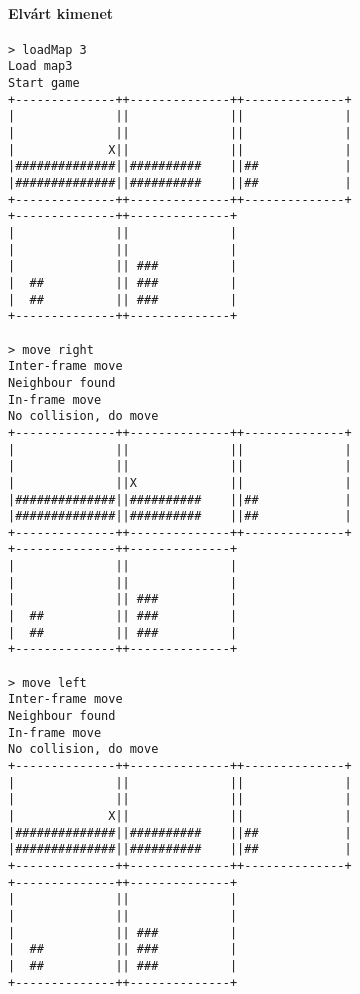 		        \paragraph*{Elvárt kimenet}
\begin{verbatim}
> loadMap 3
Load map3
Start game
+--------------++--------------++--------------+
|              ||              ||              |
|              ||              ||              |
|             X||              ||              |
|##############||##########    ||##            |
|##############||##########    ||##            |
+--------------++--------------++--------------+
+--------------++--------------+                
|              ||              |                
|              ||              |                
|              || ###          |                
|  ##          || ###          |                
|  ##          || ###          |                
+--------------++--------------+                

> move right
Inter-frame move
Neighbour found
In-frame move
No collision, do move
+--------------++--------------++--------------+
|              ||              ||              |
|              ||              ||              |
|              ||X             ||              |
|##############||##########    ||##            |
|##############||##########    ||##            |
+--------------++--------------++--------------+
+--------------++--------------+                
|              ||              |                
|              ||              |                
|              || ###          |                
|  ##          || ###          |                
|  ##          || ###          |                
+--------------++--------------+                

> move left
Inter-frame move
Neighbour found
In-frame move
No collision, do move
+--------------++--------------++--------------+
|              ||              ||              |
|              ||              ||              |
|             X||              ||              |
|##############||##########    ||##            |
|##############||##########    ||##            |
+--------------++--------------++--------------+
+--------------++--------------+                
|              ||              |                
|              ||              |                
|              || ###          |                
|  ##          || ###          |                
|  ##          || ###          |                
+--------------++--------------+                


\end{verbatim}
